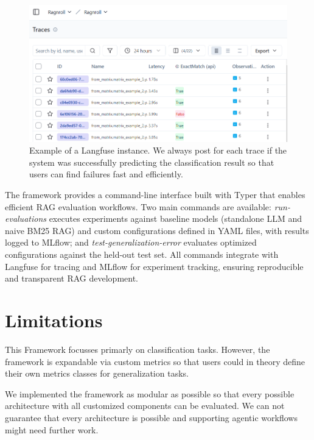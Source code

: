 \begin{figure}
\centering
\includegraphics[width=\textwidth]{images/langfuse.png}
\caption{Example of a Langfuse instance. We always post for each trace if the system was successfully predicting the classification result so that users can find failures fast and efficiently.}
\label{fig:langfuse}
\end{figure}

The framework provides a command-line interface built with Typer that enables efficient RAG evaluation workflows. Two main commands are available: \textit{run-evaluations} executes experiments against baseline models (standalone LLM and naive BM25 RAG) and custom configurations defined in YAML files, with results logged to MLflow; and \textit{test-generalization-error} evaluates optimized configurations against the held-out test set. All commands integrate with Langfuse for tracing and MLflow for experiment tracking, ensuring reproducible and transparent RAG development.

\section{Limitations}

This Framework focusses primarly on classification tasks. However, the framework is expandable via custom metrics so that users could in theory define their own metrics classes for generalization tasks. 

We implemented the framework as modular as possible so that every possible architecture with all customized components can be evaluated. We can not guarantee that every architecture is possible and supporting agentic workflows might need further work.




